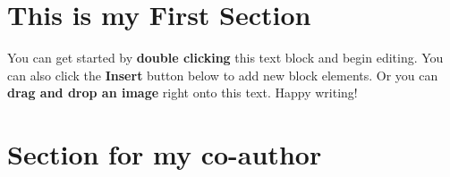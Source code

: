 


\section{This is my First Section}

You can get started by \textbf{double clicking} this text block and begin editing. You can also click the \textbf{Insert} button below to add new block elements. Or you can \textbf{drag and drop an image} right onto this text. Happy writing!

\section{Section for my co-author}


